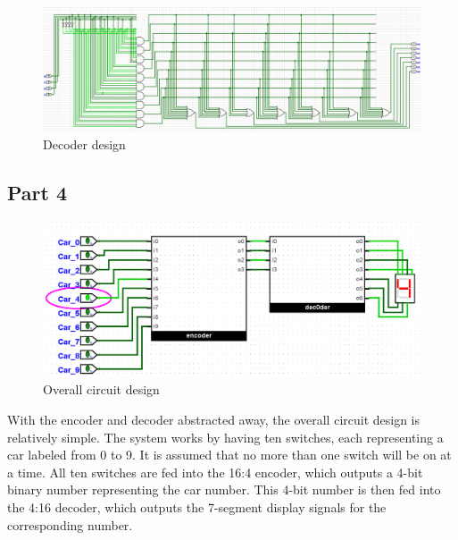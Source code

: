 \documentclass{article}
\begin{document}
\begin{figure}[H]
    \centering
    \includegraphics[width=\textwidth]{./images/decoder.png}
    \caption{Decoder design}
\end{figure}

\subsection{Part 4}
\begin{figure}[H]
    \centering
    \includegraphics[width=\textwidth]{./images/circuit2.png}
    \caption{Overall circuit design}
\end{figure}
With the encoder and decoder abstracted away, the overall circuit design is relatively simple. 
The system works by having ten switches, each representing a car labeled from 0 to 9.
It is assumed that no more than one switch will be on at a time.
All ten switches are fed into the 16:4 encoder, which outputs a 4-bit binary number representing the car number.
This 4-bit number is then fed into the 4:16 decoder, which outputs the 7-segment display signals for the corresponding number.
\end{document}
